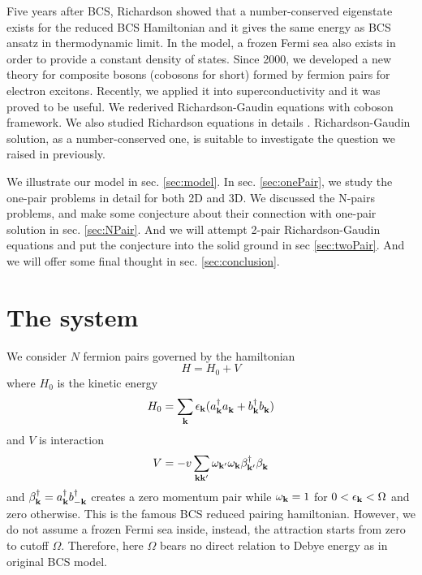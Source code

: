 \documentclass{article}
\begin{document}
Five years after BCS, Richardson showed that a number-conserved eigenstate exists for the reduced BCS Hamiltonian and it gives the same energy as BCS ansatz in thermodynamic limit\cite{Richardson1,Richardson2,Richardson3,Richardson1968,gaudin}.  In the model, a frozen Fermi sea also exists in order to provide a constant density of states.  Since 2000, we developed a new theory for composite bosons (cobosons for short) formed by fermion pairs for electron excitons\cite{CobosonPhysicsReports}.   Recently, we applied it into superconductivity and it was proved to be useful.  We rederived Richardson-Gaudin equations with coboson framework\cite{CobosonBcsRich}. We also studied Richardson equations in details \cite{CombescotCooper,combescotBCS}.  Richardson-Gaudin solution, as a number-conserved one, is  suitable to investigate the question we raised in previously.  

We illustrate our model in sec. \ref{sec:model}.  In sec. \ref{sec:onePair}, we study the one-pair problems in detail for both 2D and 3D.  We discussed the N-pairs problems, and make some conjecture about their connection with one-pair solution  in sec. \ref{sec:NPair}.  And we will attempt 2-pair Richardson-Gaudin equations and put the conjecture into the solid ground in sec \ref{sec:twoPair}.  And we will offer some final thought in sec. \ref{sec:conclusion}.
\section{The system\label{sec:model}}
We consider $N$ fermion pairs governed by the hamiltonian
\begin{equation}
H=H_{0}+V
\end{equation}
where $H_0$ is the kinetic energy 
\begin{equation}
H_0=\sum_{\mathbf{k}}\epsilon_{\mathbf{k}}(a^\dagger_{\mathbf{k}}{}a^{}_{\mathbf{k}}+b^\dagger_{\mathbf{k}}{}b^{}_{\mathbf{k}})
\label{eq:}
\end{equation}
and $V$ is interaction
\begin{equation}
V=-v\sum_{\mathbf{k}\mathbf{k}'}\omega_{\mathbf{k}'}\omega_{\mathbf{k}}\beta^\dagger_{\mathbf{k}'}{}\beta^{}_{\mathbf{k}}
\label{eq:VBcs}
\end{equation}
and $\beta^\dagger_{\mathbf{k}}=a^\dagger_{\mathbf{k}}b^\dagger_{-\mathbf{k}}$ creates a zero momentum pair while $\omega_{\mathbf{k}}=1$ for $0<\epsilon_{\mathbf{k}}<\Omega$ and zero otherwise.  This is the famous BCS reduced pairing hamiltonian. However, we do not assume a frozen Fermi sea inside, instead, the attraction starts from zero to cutoff $\Omega$.  Therefore, here $\Omega$ bears no direct relation to Debye energy as in original BCS model. 
\end{document}

